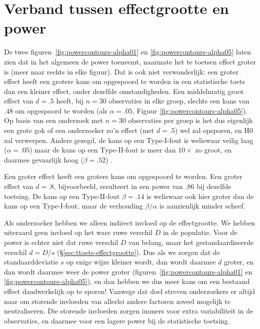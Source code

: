 \documentclass[
]{book}
\begin{document}
\hypertarget{sec:effectgrootte-power}{%
\section{Verband tussen effectgrootte en power}\label{sec:effectgrootte-power}}

De twee figuren~\ref{fig:powercontours-alpha01} en
\ref{fig:powercontours-alpha05} laten zien dat in het algemeen de
power toeneemt, naarmate het te toetsen effect groter is (meer naar
rechts in elke figuur). Dat is ook niet verwonderlijk: een groter effect
heeft een grotere kans om opgespoord te worden in een statistische toets
dan een kleiner effect, onder dezelfde omstandigheden. Een middelmatig
groot effect van \(d=.5\) heeft, bij \(n=30\) observaties in elke groep,
slechts een kans van \(.48\) om opgespoord te worden (als \(\alpha=.05\), Figuur \ref{fig:powercontours-alpha05}). Op basis van een
onderzoek met \(n=30\) observaties per groep is het dus eigenlijk een
grote gok of een onderzoeker zo'n effect (met \(d=.5\)) wel zal opsporen,
en H0 zal verwerpen. Anders gezegd, de kans op een Type-I-fout is
weliswaar veilig laag (\(\alpha=.05\)) maar de kans op een Type-II-fout is
meer dan \(10\times\) zo groot, en daarmee gevaarlijk hoog (\(\beta=.52\)) \citep[Ch.12]{Rose08}.

Een groter effect heeft een grotere kans om opgespoord te worden. Een
groter effect van \(d=.8\), bijvoorbeeld, resulteert in een power van
\(.86\) bij dezelfde toetsing. De kans op een Type-II-fout \(\beta=.14\) is
weliswaar ook hier groter dan de kans op een Type-I-fout, maar de
verhouding \(\beta/\alpha\) is aanzienlijk minder scheef.

Als onderzoeker hebben we alleen indirect invloed op de effectgrootte.
We hebben uiteraard geen invloed op het ware ruwe verschil \(D\) in de
populatie. Voor de power is echter niet dat ruwe verschil \(D\) van
belang, maar het gestandaardiseerde verschil \(d=D/s\)
(§\ref{sec:ttoets-effectgrootte}). Dus als we zorgen dat de
standaarddeviatie \(s\) op enige wijze kleiner wordt, dan wordt daarmee
\(d\) groter, en dan wordt daarmee weer de power groter
(figuren~\ref{fig:powercontours-alpha01} en \ref{fig:powercontours-alpha05}),
en dan hebben we dus meer kans
om een bestaand effect daadwerkelijk op te sporen! Vanwege dat doel
streven onderzoekers er altijd naar om storende invloeden van allerlei
andere factoren zoveel mogelijk te neutraliseren. Die storende invloeden
zorgen immers voor extra variabiliteit in de observaties, en daarmee
voor een lagere power bij de statistische toetsing.
\end{document}
